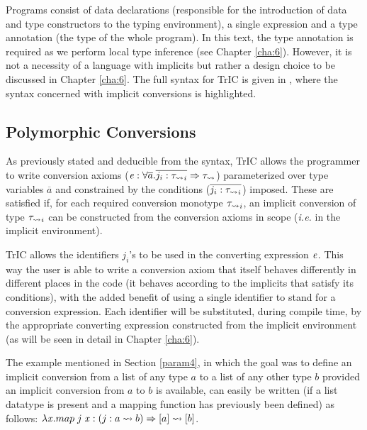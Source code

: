 Programs consist of data declarations (responsible for the introduction of data and type constructors to the typing environment), a single expression and a type annotation (the type of the whole program). In this text, the type annotation is required as we perform local type inference (see Chapter \ref{cha:6}). However, it is not a necessity of a language with implicits but rather a design choice to be discussed in Chapter \ref{cha:6}. The full syntax for TrIC is given in , where the syntax concerned with implicit conversions is highlighted.

\subsection{Polymorphic Conversions}
\label{polymorphic conversions}
As previously stated and deducible from the syntax, TrIC allows the programmer to write conversion axioms ($\mathit{e} : \forall \overline{a}.\overline{j_i : \mathit{\tau_{\rightsquigarrow}}_i} \Rightarrow \mathit{\tau_{\rightsquigarrow}}$) parameterized over type variables $\overline{a}$  and constrained by the conditions ($\overline{j_i : \mathit{\tau_{\rightsquigarrow}}_i}$) imposed. These are satisfied if, for each required conversion monotype $\mathit{\tau_{\rightsquigarrow}}_i$, an implicit conversion of type $\mathit{\tau_{\rightsquigarrow}}_i$ can be constructed from the conversion axioms in scope (\textit{i.e.} in the implicit environment).

TrIC allows the identifiers $j_i$'s to be used in the converting expression $\mathit{e}$. This way the user is able to write a conversion axiom that itself behaves differently in different places in the code (it behaves according to the implicits that satisfy its conditions), with the added benefit of using a single identifier to stand for a conversion expression. Each identifier will be substituted, during compile time, by the appropriate converting expression constructed from the implicit environment (as will be seen in detail in Chapter \ref{cha:6}).

The example mentioned in Section \ref{param4}, in which the goal was to define an implicit conversion from a list of any type $a$ to a list of any other type $b$ provided an implicit conversion from $a$ to $b$ is available, can easily be written (if a list datatype is present and a mapping function has previously been defined) as follows: $\lambda \mathit{x} . map\;j\;\mathit{x} : (j: a \rightsquigarrow b) \Rightarrow [a] \rightsquigarrow [b]$.
